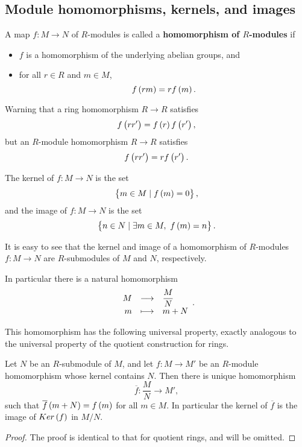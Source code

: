 \subsection{Module homomorphisms, kernels, and images}

\begin{definition}
A map $ f : M \to N $ of $ R $-modules is called a \textbf{homomorphism of $ R $-modules} if
\begin{itemize}
\item $ f $ is a homomorphism of the underlying abelian groups, and
\item for all $ r \in R $ and $ m \in M $,
$$ f\br{rm} = rf\br{m}. $$
\end{itemize}
\end{definition}

Warning that a ring homomorphism $ R \to R $ satisfies
$$ f\br{rr'} = f\br{r}f\br{r'}, $$
but an $ R $-module homomorphism $ R \to R $ satisfies
$$ f\br{rr'} = rf\br{r'}. $$

\begin{definition}
The kernel of $ f : M \to N $ is the set
$$ \cbr{m \in M \mid f\br{m} = 0}, $$
and the image of $ f : M \to N $ is the set
$$ \cbr{n \in N \mid \exists m \in M, \ f\br{m} = n}. $$
\end{definition}

It is easy to see that the kernel and image of a homomorphism of $ R $-modules $ f : M \to N $ are $ R $-submodules of $ M $ and $ N $, respectively.

\begin{note*}
In particular there is a natural homomorphism
$$ \function{M}{\dfrac{M}{N}}{m}{m + N}. $$
\end{note*}

This homomorphism has the following universal property, exactly analogous to the universal property of the quotient construction for rings.

\begin{proposition}
Let $ N $ be an $ R $-submodule of $ M $, and let $ f : M \to M' $ be an $ R $-module homomorphism whose kernel contains $ N $. Then there is unique homomorphism
$$ \overline{f} : \dfrac{M}{N} \to M', $$
such that $ \overline{f}\br{m + N} = f\br{m} $ for all $ m \in M $. In particular the kernel of $ \overline{f} $ is the image of $ Ker\br{f} $ in $ M / N $.
\end{proposition}

\begin{proof}
The proof is identical to that for quotient rings, and will be omitted.
\end{proof}


